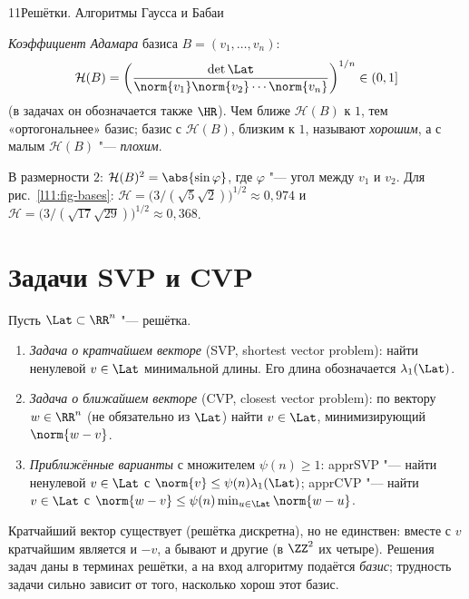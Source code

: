 \begin{lecture}{11}{Решётки. Алгоритмы Гаусса и Бабаи}
\begin{definition}
\emph{Коэффициент Адамара} базиса $B = (v_1, \dots, v_n)$:
\[
  \mathcal H(B) = \left(\frac{\det \Lat}{\norm{v_1}\norm{v_2}\cdots\norm{v_n}}\right)^{1/n}
  \in (0, 1]
\]
(в задачах он обозначается также $\HR$). Чем ближе $\mathcal H(B)$ к $1$, тем «ортогональнее»
базис; базис с $\mathcal H(B)$, близким к $1$, называют \emph{хорошим}, а с малым $\mathcal H(B)$ "---
\emph{плохим}.
\end{definition}

В размерности $2$: $\mathcal H(B)^2 = \abs{\sin\varphi}$, где $\varphi$ "--- угол между $v_1$ и
$v_2$. Для рис.~\ref{l11:fig-bases}:
$\mathcal H = \bigl(3/(\sqrt5 \sqrt2)\bigr)^{1/2} \approx 0{,}974$ и
$\mathcal H = \bigl(3/(\sqrt{17}\sqrt{29})\bigr)^{1/2} \approx 0{,}368$.


\section{Задачи SVP и CVP}

\begin{definition}
Пусть $\Lat \subset \RR^n$ "--- решётка.
\begin{enumerate}
  \item \emph{Задача о кратчайшем векторе} (SVP, shortest vector problem): найти ненулевой
    $v \in \Lat$ минимальной длины. Его длина обозначается $\lambda_1(\Lat)$.
  \item \emph{Задача о ближайшем векторе} (CVP, closest vector problem): по вектору
    $w \in \RR^n$ (не обязательно из $\Lat$) найти $v \in \Lat$, минимизирующий $\norm{w - v}$.
  \item \emph{Приближённые варианты} с множителем $\psi(n) \ge 1$: apprSVP "--- найти ненулевой
    $v \in \Lat$ с $\norm{v} \le \psi(n) \lambda_1(\Lat)$; apprCVP "--- найти $v \in \Lat$ с
    $\norm{w - v} \le \psi(n) \min_{u \in \Lat}\norm{w - u}$.
\end{enumerate}
\end{definition}

Кратчайший вектор существует (решётка дискретна), но не единствен: вместе с $v$ кратчайшим
является и $-v$, а бывают и другие (в $\ZZ^2$ их четыре). Решения задач даны в терминах
решётки, а на вход алгоритму подаётся \emph{базис}; трудность задачи сильно зависит от того,
насколько хорош этот базис.


\end{lecture}
